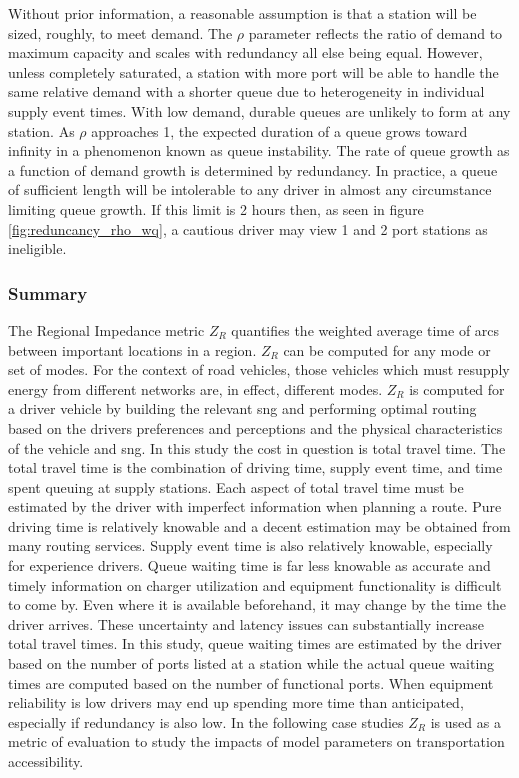 Without prior information, a reasonable assumption is that a station will be sized, roughly, to meet demand. The $\rho$ parameter reflects the ratio of demand to maximum capacity and scales with redundancy all else being equal. However, unless completely saturated, a station with more port will be able to handle the same relative demand with a shorter queue due to heterogeneity in individual supply event times. With low demand, durable queues are unlikely to form at any station. As $\rho$ approaches 1, the expected duration of a queue grows toward infinity in a phenomenon known as queue instability. The rate of queue growth as a function of demand growth is determined by redundancy. In practice, a queue of sufficient length will be intolerable to any driver in almost any circumstance limiting queue growth. If this limit is 2 hours then, as seen in figure \ref{fig:reduncancy_rho_wq}, a cautious driver may view 1 and 2 port stations as ineligible.

\subsubsection*{Summary}

The Regional Impedance metric $Z_R$ quantifies the weighted average time of arcs between important locations in a region. $Z_R$ can be computed for any mode or set of modes. For the context of road vehicles, those vehicles which must resupply energy from different networks are, in effect, different modes. $Z_R$ is computed for a driver vehicle by building the relevant \gls{sng} and performing optimal routing based on the drivers preferences and perceptions and the physical characteristics of the vehicle and \gls{sng}. In this study the cost in question is total travel time. The total travel time is the combination of driving time, supply event time, and time spent queuing at supply stations. Each aspect of total travel time must be estimated by the driver with imperfect information when planning a route. Pure driving time is relatively knowable and a decent estimation may be obtained from many routing services. Supply event time is also relatively knowable, especially for experience drivers. Queue waiting time is far less knowable as accurate and timely information on charger utilization and equipment functionality is difficult to come by. Even where it is available beforehand, it may change by the time the driver arrives. These uncertainty and latency issues can substantially increase total travel times. In this study, queue waiting times are estimated by the driver based on the number of ports listed at a station while the actual queue waiting times are computed based on the number of functional ports. When equipment reliability is low drivers may end up spending more time than anticipated, especially if redundancy is also low. In the following case studies $Z_R$ is used as a metric of evaluation to study the impacts of model parameters on transportation accessibility.